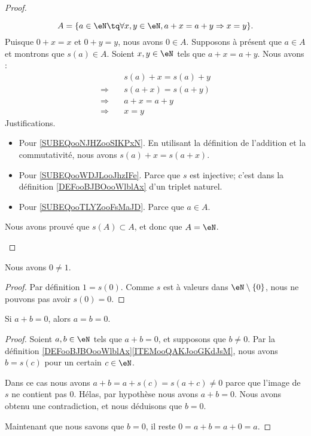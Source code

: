 \begin{proof}
\begin{subproof}
		\begin{equation}
			A=\{ a\in \eN\tq\forall x,y\in \eN, a+x=a+y\Rightarrow x=y\}.
		\end{equation}
		Puisque \( 0+x=x\) et \( 0+y=y\), nous avons \( 0\in A\). Supposons à présent que \( a\in A\) et montrons que \( s(a)\in A\). Soient \( x,y\in \eN\) tels que \( a+x=a+y\). Nous avons :
		\begin{subequations}
			\begin{align}
				            & \quad s(a)+x=s(a)+y                                \\
				\Rightarrow & \quad s(a+x)=s(a+y)    \label{SUBEQooNJHZooSIKPxN} \\
				\Rightarrow & \quad a+x=a+y          \label{SUBEQooWDJLooJhzIFe} \\
				\Rightarrow & \quad x=y              \label{SUBEQooTLYZooFsMaJD}
			\end{align}
		\end{subequations}
		Justifications.
		\begin{itemize}
			\item Pour \eqref{SUBEQooNJHZooSIKPxN}. En utilisant la définition de l'addition et la commutativité, nous avons \( s(a)+x=s(a+x)\).
			\item Pour \eqref{SUBEQooWDJLooJhzIFe}. Parce que \( s\) est injective; c'est dans la définition \ref{DEFooBJBOooWlblAx} d'un triplet naturel.
			\item Pour \eqref{SUBEQooTLYZooFsMaJD}. Parce que \( a\in A\).
		\end{itemize}
		Nous avons prouvé que \( s(A)\subset A\), et donc que \( A=\eN\).
	\end{subproof}
\end{proof}

\begin{lemma}       \label{LEMooCOMSooEWrumL}
	Nous avons \( 0\neq 1\).
\end{lemma}

\begin{proof}
	Par définition \( 1=s(0)\). Comme \( s\) est à valeurs dans \( \eN\setminus\{ 0 \}\), nous ne pouvons pas avoir \( s(0)=0\).
\end{proof}

\begin{lemma}       \label{LEMooQBHFooCuCusQ}
	Si \( a+b=0\), alors \( a=b=0\).
\end{lemma}

\begin{proof}
	Soient \( a,b\in \eN\) tels que \( a+b=0\), et supposons que \( b\neq 0\). Par la définition \ref{DEFooBJBOooWlblAx}\ref{ITEMooQAKJooGKdJsM}, nous avons \( b=s(c)\) pour un certain \( c\in \eN\).

	Dans ce cas nous avons \( a+b=a+s(c)=s(a+c)\neq 0\) parce que l'image de \( s\) ne contient pas \( 0\). Hélas, par hypothèse nous avons \( a+b=0\). Nous avons obtenu une contradiction, et nous déduisons que \( b=0\).

	Maintenant que nous savons que \( b=0\), il reste \( 0=a+b=a+0=a\).
\end{proof}

